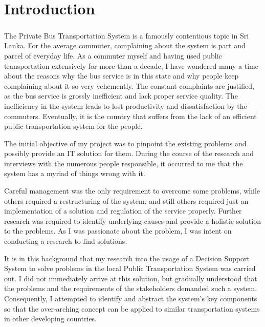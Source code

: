 \documentclass[12pt, oneside]{report}
\begin{document}

\chapter{Introduction}
\label{chapter-Introduction}

\paragraph{ } The Private Bus Transportation System is a famously contentious topic in Sri Lanka. For the average commuter, complaining about the system is part and parcel of everyday life. As a commuter myself and having used public transportation extensively for more than a decade, I have wondered many a time about the reasons why the bus service is in this state and why people keep complaining about it so very vehemently. The constant complaints are justified, as the bus service is grossly inefficient and lack proper service quality. The inefficiency in the system leads to lost productivity and dissatisfaction by the commuters. Eventually, it is the country that suffers from the lack of an efficient public transportation system for the people.

The initial objective of my project was to pinpoint the existing problems and possibly provide an IT solution for them. During the course of the research and interviews with the numerous people responsible, it occurred to me that the system has a myriad of things wrong with it. 

Careful management was the only requirement to overcome some problems, while others required a restructuring of the system, and still others required just an implementation of a solution and regulation of the service properly. Further research was required to identify underlying causes and provide a holistic solution to the problems. As I was passionate about the problem, I was intent on conducting a research to find solutions.

It is in this background that my research into the usage of a Decision Support System to solve problems in the local Public Transportation System was carried out. I did not immediately arrive at this solution, but gradually understood that the problems and the requirements of the stakeholders demanded such a system. Consequently, I attempted to identify and abstract the system's key components so that the over-arching concept can be applied to similar transportation systems in other developing countries.
\end{document}
